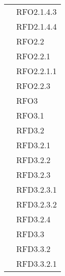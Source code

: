 \begin{longtable}{|>{\centering}m{10cm}|m{3cm}<{\centering}|}
& RFO2.1.4.3\\
& RFD2.1.4.4\\
& RFO2.2\\
& RFO2.2.1\\
& RFO2.2.1.1\\
& RFO2.2.3\\
& RFO3\\
& RFO3.1\\
& RFD3.2\\
& RFD3.2.1\\
& RFD3.2.2\\
& RFD3.2.3\\
& RFD3.2.3.1\\
& RFD3.2.3.2\\
& RFD3.2.4\\
& RFD3.3\\
& RFD3.3.2\\
& RFD3.3.2.1\\ \hline


\end{longtable}
